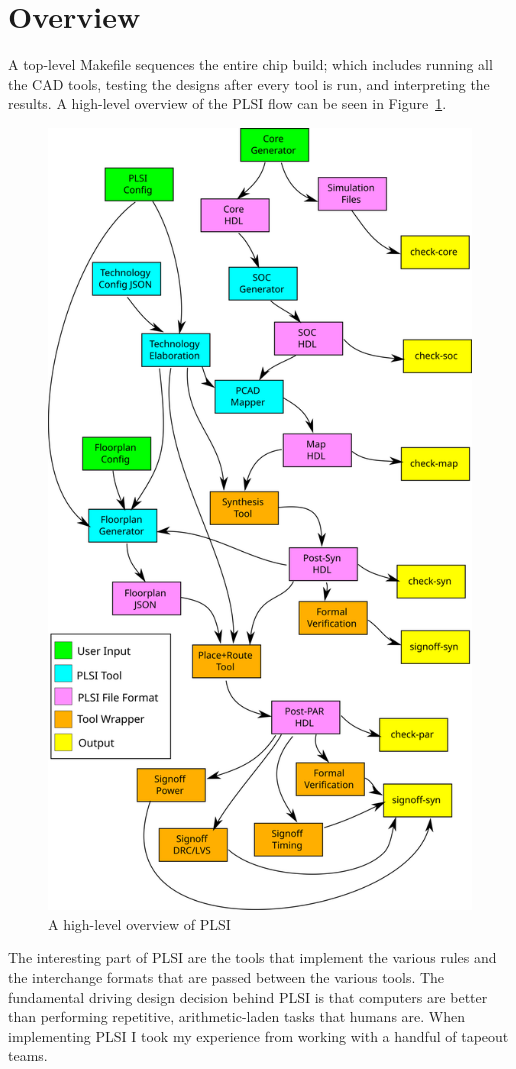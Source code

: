 \documentclass{article}
\begin{document}
\section{Overview}

A top-level Makefile sequences the entire chip build; which includes running
all the CAD tools, testing the designs after every tool is run, and
interpreting the results.  A high-level overview of the PLSI flow can be seen
in Figure~\ref{impl:plsi-flow}.

\begin{figure}
\begin{center}
\includegraphics[width=0.7\linewidth]{figures/plsi-flow.svg}
\end{center}
\caption{A high-level overview of PLSI}
\label{impl:plsi-flow}
\end{figure}

The interesting part of PLSI are the tools that implement the various rules and
the interchange formats that are passed between the various tools.  The
fundamental driving design decision behind PLSI is that computers are better
than performing repetitive, arithmetic-laden tasks that humans are.  When
implementing PLSI I took my experience from working with a handful of tapeout
teams.
\end{document}
